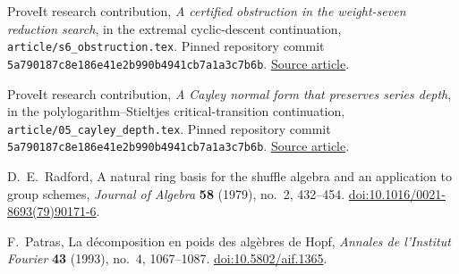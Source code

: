 ProveIt research contribution,
\emph{A certified obstruction in the weight-seven reduction search},
in the extremal cyclic-descent continuation,
\texttt{article/s6\_obstruction.tex}.
Pinned repository commit
\texttt{5a790187c8e186e41e2b990b4941cb7a1a3c7b6b}.
\href{https://github.com/VladimirReshetnikov/ProveIt/blob/5a790187c8e186e41e2b990b4941cb7a1a3c7b6b/Analysis/Polylogarithms/docs/reports/formal-reductions-continuation/continuations/extremal-cyclic-descent/article/s6_obstruction.tex}{Source article}.

ProveIt research contribution,
\emph{A Cayley normal form that preserves series depth},
in the polylogarithm--Stieltjes critical-transition continuation,
\texttt{article/05\_cayley\_depth.tex}.
Pinned repository commit
\texttt{5a790187c8e186e41e2b990b4941cb7a1a3c7b6b}.
\href{https://github.com/VladimirReshetnikov/ProveIt/blob/5a790187c8e186e41e2b990b4941cb7a1a3c7b6b/Analysis/Polylogarithms/docs/reports/uniform-transition-continuation/continuations/polylog-stieltjes-critical-transition/article/05_cayley_depth.tex}{Source article}.

D.~E.~Radford,
A natural ring basis for the shuffle algebra and an application to group
schemes, \emph{Journal of Algebra} \textbf{58} (1979), no.~2, 432--454.
\href{https://doi.org/10.1016/0021-8693(79)90171-6}{doi:10.1016/0021-8693(79)90171-6}.

F.~Patras,
La d\'ecomposition en poids des alg\`ebres de Hopf,
\emph{Annales de l'Institut Fourier} \textbf{43} (1993), no.~4, 1067--1087.
\href{https://doi.org/10.5802/aif.1365}{doi:10.5802/aif.1365}.

